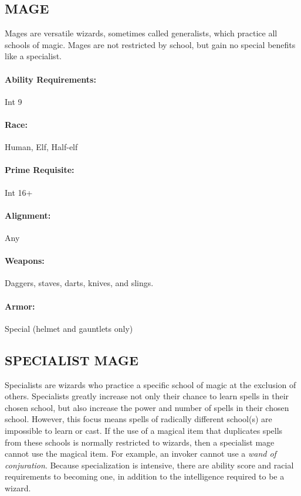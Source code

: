 \begin{multicols}{2}

\subsection{MAGE}

Mages are versatile wizards, sometimes called generalists, which practice all schools of magic.  Mages are not restricted by school, but gain no special benefits like a specialist.  

\paragraph{Ability Requirements:} Int 9

\paragraph{Race:} Human, Elf, Half-elf

\paragraph{Prime Requisite:} Int 16+

\paragraph{Alignment:} Any

\paragraph{Weapons:} Daggers, staves, darts, knives, and slings.

\paragraph{Armor:} Special (helmet and gauntlets only) 

 
\subsection{SPECIALIST MAGE}

Specialists are wizards who practice a specific school of magic at the exclusion of others.  Specialists greatly increase not only their chance to learn spells in their chosen school, but also increase the power and number of spells in their chosen school.  However, this focus means spells of radically different school(s) are impossible to learn or cast.  If the use of a magical item that duplicates spells from these schools is normally restricted to wizards, then a specialist mage cannot use the magical item.  For example, an invoker cannot use a \textit{wand of conjuration}.  Because specialization is intensive, there are ability score and racial requirements to becoming one, in addition to the intelligence required to be a wizard.


\end{multicols}
